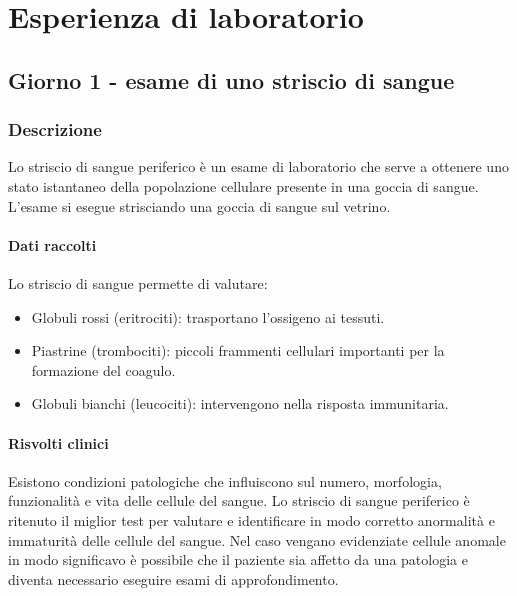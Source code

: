 \chapter{Esperienza di laboratorio}
\section{Giorno 1 - esame di uno striscio di sangue}

	\subsection{Descrizione}
	Lo striscio di sangue periferico \`e un esame di laboratorio che serve a ottenere uno stato istantaneo della popolazione cellulare presente in una goccia di sangue. 
	L'esame si esegue strisciando una goccia di sangue sul vetrino. 

		\subsubsection{Dati raccolti}
		Lo striscio di sangue permette di valutare:
		\begin{multicols}{2}
		\begin{itemize}
			\item Globuli rossi (eritrociti): trasportano l'ossigeno ai tessuti.
			\item Piastrine (trombociti): piccoli frammenti cellulari importanti per la formazione del coagulo.
			\item Globuli bianchi (leucociti): intervengono nella risposta immunitaria.
		\end{itemize}
	\end{multicols}

		\subsubsection{Risvolti clinici}
		Esistono condizioni patologiche che influiscono sul numero, morfologia, funzionalit\`a e vita delle cellule del sangue. 
		Lo striscio di sangue periferico \`e ritenuto il miglior test per valutare e identificare in modo corretto anormalit\`a e immaturit\`a delle cellule del sangue. 
		Nel caso vengano evidenziate cellule anomale in modo significavo \`e possibile che il paziente sia affetto da una patologia e diventa necessario eseguire esami di approfondimento.

